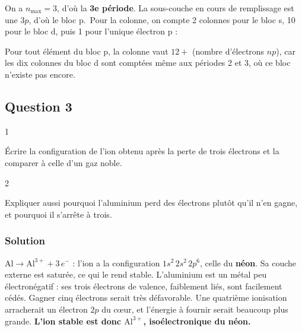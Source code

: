 \documentclass[11pt,a4paper]{article}
\newcommand{\equationajustee}[1]{%
  \sbox{\boiteequation}{$\displaystyle #1$}%
  \ifdim\wd\boiteequation>\linewidth
    \[\resizebox{\linewidth}{!}{\usebox{\boiteequation}}\]%
  \else
    \[#1\]%
  \fi}
\begin{document}
On a \(n_{\max}=3\), d'où la \textbf{3e période}. La sous-couche en cours de remplissage est une \(3p\), d'où le bloc p.~Pour la colonne, on compte 2 colonnes pour le bloc s, 10 pour le bloc d, puis 1 pour l'unique électron p :

\equationajustee{\boxed{\text{\text{période} }3,\ \text{colonne }13}}

\begin{methode}

Pour tout élément du bloc p, la colonne vaut \(12+\) (nombre d'électrons \(np\)), car les dix colonnes du bloc d sont comptées même aux périodes 2 et 3, où ce bloc n'existe pas encore.

\end{methode}

\hypertarget{question-3}{%
\subsection{Question 3}\label{question-3}}

\begin{indication}{1}

Écrire la configuration de l'ion obtenu après la perte de trois électrons et la comparer à celle d'un gaz noble.

\end{indication}

\begin{indication}{2}

Expliquer aussi pourquoi l'aluminium perd des électrons plutôt qu'il n'en gagne, et pourquoi il s'arrête à trois.

\end{indication}

\hypertarget{solution-2}{%
\subsubsection{Solution}\label{solution-2}}

\(\mathrm{Al}\to\mathrm{Al^{3+}}+3\,e^-\) : l'ion a la configuration \(1s^2\,2s^2\,2p^6\), celle du \textbf{néon}. Sa couche externe est saturée, ce qui le rend stable. L'aluminium est un métal peu électronégatif : ses trois électrons de valence, faiblement liés, sont facilement cédés. Gagner cinq électrons serait très défavorable. Une quatrième ionisation arracherait un électron \(2p\) du cœur, et l'énergie à fournir serait beaucoup plus grande. \textbf{L'ion stable est donc \(\mathrm{Al^{3+}}\), isoélectronique du néon.}
\end{document}
